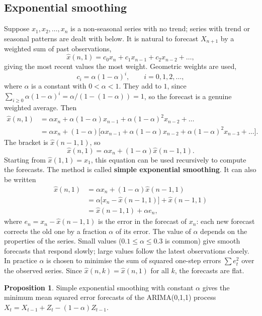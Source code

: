 \documentclass[11pt,a4paper]{article}
\theoremstyle{definition}
\newtheorem{prop}[thm]{Proposition}
\begin{document}
\subsection{Exponential smoothing}
Suppose $x_1, x_2, \dots, x_n$ is a non-seasonal series with no trend; series with trend or seasonal patterns are dealt with
below. It is natural to forecast $X_{n+1}$ by a weighted sum of past observations,
\[
\hat x(n, 1) = c_0x_n + c_1x_{n-1} + c_2x_{n-2} + \dots ,
\]
giving the most recent values the most weight. Geometric weights are used,
\[
c_i = \alpha(1 - \alpha)^i , \qquad i = 0, 1, 2, \dots ,
\]
where $\alpha$ is a constant with $0 < \alpha < 1$. They add to $1$, since $\sum_{i\ge0}\alpha(1 - \alpha)^i = \alpha/(1 - (1 - \alpha)) = 1$, so the forecast is a genuine weighted
average. Then
\begin{align*}
\hat x(n, 1) &= \alpha x_n + \alpha(1 - \alpha)x_{n-1} + \alpha(1 - \alpha)^2x_{n-2} + \dots \\
&= \alpha x_n + (1 - \alpha)\bigl[\alpha x_{n-1} + \alpha(1 - \alpha)x_{n-2} + \alpha(1 - \alpha)^2x_{n-3} + \dots\bigr] .
\end{align*}
The bracket is $\hat x(n - 1, 1)$, so
\[
\hat x(n, 1) = \alpha x_n + (1 - \alpha)\hat x(n - 1, 1) .
\]
Starting from $\hat x(1, 1) = x_1$, this equation can be used recursively to compute the forecasts. The method is called
\textbf{simple exponential smoothing}. It can also be written
\begin{align*}
\hat x(n, 1) &= \alpha x_n + (1 - \alpha)\hat x(n - 1, 1) \\
&= \alpha\bigl[x_n - \hat x(n - 1, 1)\bigr] + \hat x(n - 1, 1) \\
&= \hat x(n - 1, 1) + \alpha e_n ,
\end{align*}
where $e_n = x_n - \hat x(n - 1, 1)$ is the error in the forecast of $x_n$: each new forecast corrects the old one by a fraction $\alpha$
of its error. The value of $\alpha$ depends on the properties of the series. Small values ($0.1 \le \alpha \le 0.3$ is common) give
smooth forecasts that respond slowly; large values follow the latest observations closely. In practice $\alpha$ is
chosen to minimise the sum of squared one-step errors $\sum e_t^2$ over the observed series. Since $\hat x(n, k) = \hat x(n, 1)$ for all $k$,
the forecasts are flat.

\begin{prop}\label{prop:ses-arima}
Simple exponential smoothing with constant $\alpha$ gives the minimum mean squared error forecasts of the
ARIMA(0,1,1) process $X_t = X_{t-1} + Z_t - (1 - \alpha)Z_{t-1}$.
\end{prop}
\end{document}
